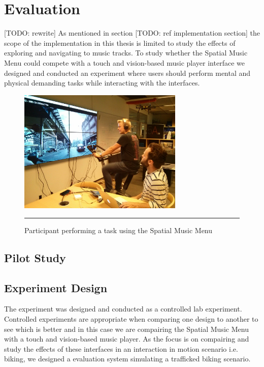 \chapter{Evaluation}
\label{sec:evaluation}
[TODO: rewrite]
As mentioned in section [TODO: ref implementation section] the scope of the implementation in this thesis is limited to study the effects of exploring and navigating to music tracks. To study whether the Spatial Music Menu could compete with a touch and vision-based music player interface we designed and conducted an experiment where users should perform mental and physical demanding tasks while interacting with the interfaces.

\begin{figure}[h]
	\centering
		\includegraphics[width=0.7\textwidth,height=\textheight,keepaspectratio]{./Figures/evaluation_spatial.jpg}
		\rule{35em}{1pt}
	\caption[Evaluation Spatial Music Menu]{Participant performing a task using the Spatial Music Menu}
	\label{fig:evalspatial}
\end{figure}


\section{Pilot Study}






\section{Experiment Design}
The experiment was designed and conducted as a controlled lab experiment. Controlled experiments are appropriate when comparing one design to another to see which is better \cite{benyon_designing_2010} and in this case we are compairing the Spatial Music Menu with a touch and vision-based music player. As the focus is on compairing and study the effects of these interfaces in an interaction in motion scenario i.e. biking, we designed a evaluation system simulating a trafficked biking scenario.


